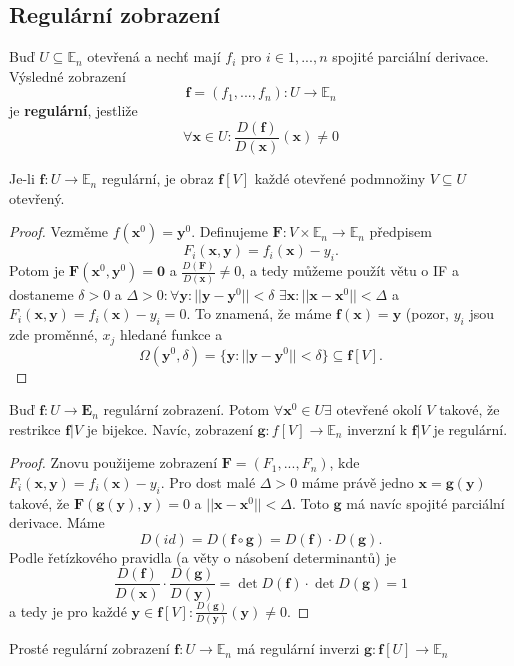 \documentclass[../main.tex]{subfiles}
\begin{document}
\subsection{Regulární zobrazení}
\begin{definition}
	Buď $U \subseteq \mathbb{E}_n$ otevřená a nechť mají $f_i$ pro $i \in {1, ... , n}$
	spojité parciální derivace. Výsledné zobrazení
	\[ \mathbf{f} = (f_1, ... , f_n): U \to \mathbb{E}_n \]
	je \textbf{regulární}, jestliže
	\[ \forall \mathbf{x} \in U: \frac{D(\mathbf{f})}{D(\mathbf{x})}(\mathbf{x}) \neq 0 \]
\end{definition}

\begin{lemma}
	Je-li $\mathbf{f}: U \to \mathbb{E}_n$ regulární, je obraz $\mathbf{f}[V]$ každé otevřené podmnožiny
	$V \subseteq U$ otevřený.
\end{lemma}

\begin{proof}
	Vezměme $f(\textbf{x}^0) = \textbf{y}^0.$ Definujeme $\textbf{F} : V \times \mathbb{E}_n \rightarrow \mathbb{E}_n$ předpisem
	\[F_i(\textbf{x},\textbf{y}) = f_i(\textbf{x}) - y_i.\]
	Potom je $\textbf{F}(\textbf{x}^0,\textbf{y}^0) = \textbf{0}$
	a $\frac{D(\textbf{F})}{D(\textbf{x})} \neq 0$, 
	a tedy můžeme použít větu o IF a dostaneme 
	$\delta > 0$ a $\Delta > 0 : \forall \textbf{y} : ||\textbf{y} - \textbf{y}^0|| < \delta$ $\exists \textbf{x} : ||\textbf{x} - \textbf{x}^0|| < \Delta$ a 
	$F_i(\textbf{x},\textbf{y}) = f_i(\textbf{x}) - y_i = 0$. To znamená, že máme $\textbf{f}(\textbf{x}) = \textbf{y}$ (pozor, $y_i$ jsou zde proměnné, $x_j$ hledané funkce a
	\[\Omega(\textbf{y}^0,\delta) = \{\textbf{y} : ||\textbf{y} - \textbf{y}^0 || < \delta \} \subseteq \textbf{f}[V].\]
\end{proof}

\begin{lemma}
	Buď $\mathbf{f}: U \to \mathbf{E}_n$ regulární zobrazení. Potom $\forall \mathbf{x}^0 \in U \exists$
	otevřené okolí $V$ takové, že restrikce $\mathbf{f}|V$ je bijekce. Navíc, zobrazení
	$\mathbf{g}: f[V] \to \mathbb{E}_n$ inverzní k $\mathbf{f}|V$ je regulární.
\end{lemma}

\begin{proof}
	Znovu použijeme zobrazení $\textbf{F} = (F_1,...,F_n)$, kde $F_i(\textbf{x},\textbf{y}) = f_i(\textbf{x})-y_i$. Pro dost malé 
	$\Delta > 0$ máme právě jedno $\textbf{x} = \textbf{g}(\textbf{y})$ takové, že $\textbf{F}(\mathbf{g}(\textbf{y}),\textbf{y}) = 0$ a $||\textbf{x} - \textbf{x}^0|| < \Delta$.
	Toto $\textbf{g}$ má navíc spojité parciální derivace. Máme
	\[D(id) = D(\textbf{f}\circ\textbf{g}) = D(\textbf{f})\cdot D(\textbf{g}).\]
	Podle řetízkového pravidla (a věty o násobení determinantů) je 
	\[\frac{D(\textbf{f})}{D(\textbf{x})}\cdot\frac{D(\textbf{g})}{D(\textbf{y})} = \det D(\textbf{f})\cdot \det D(\textbf{g}) = 1\]
	a tedy je pro každé $\textbf{y} \in \textbf{f}[V] \colon \frac{D(\textbf{g})}{D(\textbf{y})}(\textbf{y}) \neq 0$.
\end{proof}

\begin{consequence}
	Prosté regulární zobrazení $\mathbf{f}: U \to \mathbb{E}_n$ má regulární inverzi
	$\mathbf{g}: \mathbf{f}[U] \to \mathbb{E}_n$
\end{consequence}
\end{document}
